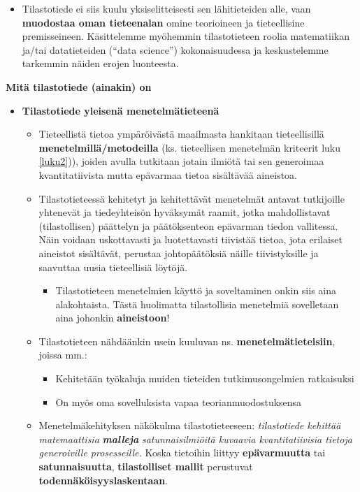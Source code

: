 \documentclass[
]{book}
\providecommand{\tightlist}{%
  \setlength{\itemsep}{0pt}\setlength{\parskip}{0pt}}
\begin{document}
\begin{itemize}
  \begin{itemize}
  \tightlist
  \item
    Tilastotiede ei siis kuulu yksiselitteisesti sen lähitieteiden alle, vaan \textbf{muodostaa oman tieteenalan} omine teorioineen ja tieteellisine premisseineen. Käsittelemme myöhemmin tilastotieteen roolia matematiikan ja/tai datatieteiden (``data science'') kokonaisuudessa ja keskustelemme tarkemmin näiden erojen luonteesta.
  \end{itemize}
\end{itemize}

\hfill\break
\hfill\break

\textbf{Mitä tilastotiede (ainakin) on}

\begin{itemize}
\tightlist
\item
  \textbf{Tilastotiede yleisenä menetelmätieteenä}

  \begin{itemize}
  \tightlist
  \item
    Tieteellistä tietoa ympäröivästä maailmasta hankitaan tieteellisillä \textbf{menetelmillä/metodeilla} (ks. tieteellisen menetelmän kriteerit luku \ref{luku2})), joiden avulla tutkitaan jotain ilmiötä tai sen generoimaa kvantitatiivista mutta epävarmaa tietoa sisältävää aineistoa.
  \item
    Tilastotieteessä kehitetyt ja kehitettävät menetelmät antavat tutkijoille yhtenevät ja tiedeyhteisön hyväksymät raamit, jotka mahdollistavat (tilastollisen) päättelyn ja päätöksenteon epävarman tiedon vallitessa. Näin voidaan uskottavasti ja luotettavasti tiivistää tietoa, jota erilaiset aineistot sisältävät, perustaa johtopäätöksiä näille tiivistyksille ja saavuttaa uusia tieteellisiä löytöjä.

    \begin{itemize}
    \tightlist
    \item
      Tilastotieteen menetelmien käyttö ja soveltaminen onkin siis aina alakohtaista. Tästä huolimatta tilastollisia menetelmiä sovelletaan aina johonkin \textbf{aineistoon}!
    \end{itemize}
  \item
    Tilastotieteen nähdäänkin usein kuuluvan ns. \textbf{menetelmätieteisiin}, joissa mm.:

    \begin{itemize}
    \tightlist
    \item
      Kehitetään työkaluja muiden tieteiden tutkimusongelmien ratkaisuksi
    \item
      On myös oma sovelluksista vapaa teorianmuodostuksensa
    \end{itemize}
  \item
    Menetelmäkehityksen näkökulma tilastotieteeseen: \emph{tilastotiede kehittää matemaattisia} \textbf{\emph{malleja}} \emph{satunnaisilmiöitä kuvaavia kvantitatiivisia tietoja generoiville prosesseille.} Koska tietoihin liittyy \textbf{epävarmuutta} tai \textbf{satunnaisuutta}, \textbf{tilastolliset mallit} perustuvat \textbf{todennäköisyyslaskentaan}.


\end{itemize}
\end{itemize}
\end{document}
